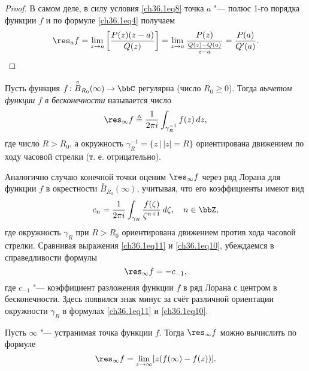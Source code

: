 \begin{proof}
В самом деле, в силу условия \eqref{ch36.1eq8} точка $a$ "--- полюс 1-го порядка функции $f$ и по формуле  \eqref{ch36.1eq4} получаем
\begin{equation*}
\res_{a} f = \lim_{z \to a} \left[ \frac{P(z)(z - a)}{Q(z)}\right] = \lim_{z \to a} \frac{P(z)}{\frac{Q(z) - Q(a)}{z - a}} = \frac{P(a)}{Q'(a)}. \qedhere
\end{equation*}
\end{proof}

\begin{defn} \label{ch36defn2}
Пусть функция $f\colon \overset{\circ}{B}_{R_0}(\infty) \to \bbC$ регулярна (число $R_0 \ge 0$). Тогда \textit{вычетом функции $f$ в бесконечности} называется число
\begin{equation} \label{ch36.1eq10}
\res_{\infty} f \triangleq \frac{1}{2\pi i} \int_{\gamma_R^{-1}} f(z) \,dz,
\end{equation}
где число $R > R_0$, а окружность $\gamma_R^{-1} = \{ z \,\big|\, |z| = R \}$ ориентирована движением по ходу часовой стрелки (т. е. отрицательно).
\end{defn}

Аналогично случаю конечной точки оценим $\res_{\infty} f$ через ряд Лорана для функции $f$ в окрестности $\overset{\circ}{B}_{R_0}(\infty)$, учитывая, что его коэффициенты имеют вид
\begin{equation} \label{ch36.1eq11}
c_n = \frac{1}{2\pi i} \int_{\gamma_R} \frac{f(\zeta)}{\zeta^{n + 1}} \,d\zeta, \quad n \in \bbZ,
\end{equation}
где окружность $\gamma_R$ при $R > R_0$ ориентирована движением против хода часовой стрелки. Сравнивая выражения \eqref{ch36.1eq11} и \eqref{ch36.1eq10}, убеждаемся в справедливости формулы
\begin{equation} \label{ch36.1eq12}
\res_{\infty} f = -c_{-1},
\end{equation}
где $c_{-1}$ "--- коэффициент разложения функции $f$ в ряд Лорана с центром в бесконечности. Здесь появился знак минус за счёт различной ориентации окружности $\gamma_R$ в формулах \eqref{ch36.1eq11} и \eqref{ch36.1eq10}.

\begin{lemm} \label{ch36.1lemm3}
Пусть $\infty$ "--- устранимая точка функции $f$. Тогда $\res_{\infty} f$ можно вычислить по формуле
\begin{equation} \label{ch36.1eq13}
\res_{\infty} f = \lim_{z \to \infty} [z(f(\infty) - f(z))].
\end{equation}

\end{lemm}


